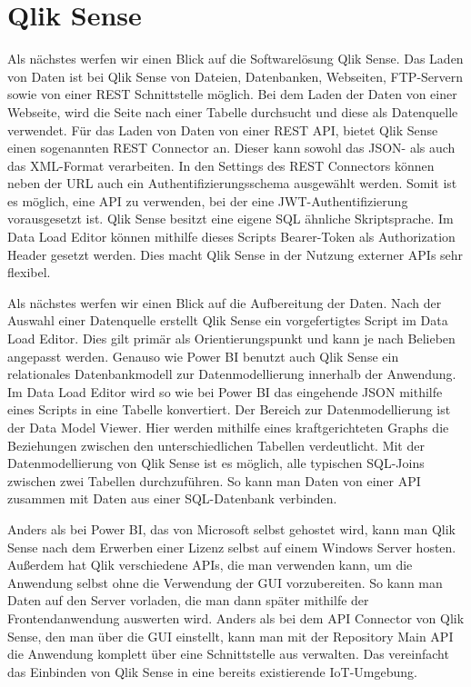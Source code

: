 \section{Qlik Sense}
\label{sec:qliksense}
Als nächstes werfen wir einen Blick auf die Softwarelösung Qlik Sense.
Das Laden von Daten ist bei Qlik Sense von Dateien, Datenbanken, Webseiten, FTP-Servern sowie von einer
REST Schnittstelle möglich. Bei dem Laden der Daten von einer Webseite, wird die Seite nach einer Tabelle
durchsucht und diese als Datenquelle verwendet.\cite[S. 17]{QlikSenseCookbook} Für das Laden von Daten von
einer REST API, bietet Qlik Sense einen sogenannten REST Connector an. Dieser kann sowohl das JSON- als auch
das XML-Format verarbeiten. In den Settings des REST Connectors können neben der URL auch ein
Authentifizierungsschema ausgewählt werden.\cite[S. 23]{QlikSenseCookbook} Somit ist es möglich,
eine API zu verwenden, bei der eine JWT-Authentifizierung vorausgesetzt ist. Qlik Sense besitzt
eine eigene SQL ähnliche Skriptsprache. Im Data Load Editor
können mithilfe dieses Scripts Bearer-Token als Authorization Header gesetzt werden. Dies macht Qlik
Sense in der Nutzung externer APIs sehr flexibel.

Als nächstes werfen wir einen Blick auf die Aufbereitung der Daten. Nach der Auswahl einer Datenquelle
erstellt Qlik Sense ein vorgefertigtes Script im Data Load Editor. Dies gilt primär als Orientierungspunkt
und kann je nach Belieben angepasst werden. Genauso wie Power BI benutzt auch Qlik Sense ein relationales
Datenbankmodell zur Datenmodellierung innerhalb der Anwendung. Im Data Load Editor
wird so wie bei Power BI das eingehende JSON mithilfe eines Scripts in eine Tabelle konvertiert.
Der Bereich zur Datenmodellierung ist der Data Model Viewer.
Hier werden mithilfe eines kraftgerichteten Graphs die Beziehungen zwischen den unterschiedlichen
Tabellen verdeutlicht. Mit der Datenmodellierung von Qlik Sense ist es möglich, alle typischen SQL-Joins
zwischen zwei Tabellen durchzuführen. So kann man Daten von einer API zusammen mit Daten aus einer SQL-Datenbank
verbinden. 

Anders als bei Power BI, das von Microsoft selbst gehostet wird, kann man Qlik Sense nach dem Erwerben
einer Lizenz selbst auf einem Windows Server hosten. Außerdem hat Qlik verschiedene APIs, die man
verwenden kann, um die Anwendung selbst ohne die Verwendung der GUI vorzubereiten. So kann man Daten
auf den Server vorladen, die man dann später mithilfe der Frontendanwendung auswerten wird. Anders als bei
dem API Connector von Qlik Sense, den man über die GUI einstellt, kann man mit der Repository Main API
die Anwendung komplett über eine Schnittstelle aus verwalten.\cite{QlikSenseRepositoryMainAPI}
Das vereinfacht das Einbinden von Qlik Sense in eine bereits existierende IoT-Umgebung.

